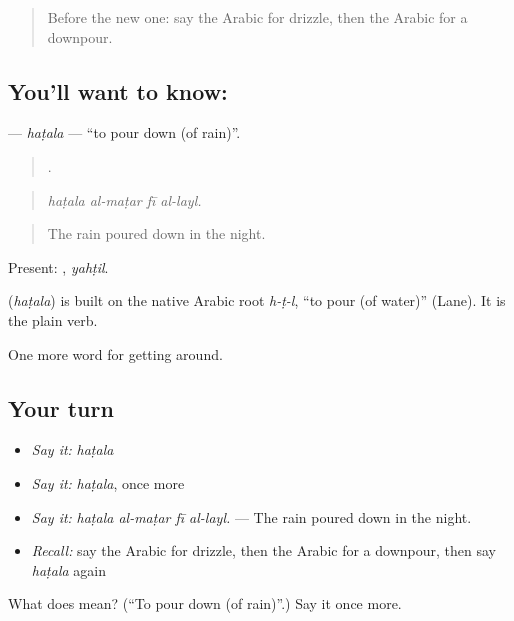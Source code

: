 \begin{quote}
Before the new one: say the Arabic for drizzle, then the Arabic for a downpour.
\end{quote}

\subsection*{You'll want to know: }
\textbf{} — \emph{haṭala} — \textquotedblleft{}to pour down (of rain)\textquotedblright{}.

\begin{quote}
   .
\end{quote}

\begin{quote}
\emph{haṭala al-maṭar fī al-layl.}
\end{quote}

\begin{quote}
The rain poured down in the night.
\end{quote}

Present: , \emph{yahṭil}.

\begin{cousinweb}
\textbf{} (\emph{haṭala}) is built on the native Arabic root \emph{h-ṭ-l}, \textquotedblleft{}to pour (of water)\textquotedblright{} (Lane). It is the plain verb.
\end{cousinweb}

\begin{grammarlens}[title={What you've built}]
One more word for getting around.
\end{grammarlens}

\subsection*{Your turn}
\begin{itemize}
\raggedright
  \item \emph{Say it:} \emph{haṭala}
  \item \emph{Say it:} \emph{haṭala}, once more
  \item \emph{Say it:} \emph{haṭala al-maṭar fī al-layl.} — The rain poured down in the night.
  \item \emph{Recall:} say the Arabic for drizzle, then the Arabic for a downpour, then say \emph{haṭala} again
\end{itemize}

\begin{tcolorbox}[breakable,colback=teal!4,colframe=teal!35!black,title={Before you move on}]
What does  mean? (\textquotedblleft{}To pour down (of rain)\textquotedblright{}.) Say it once more.
\end{tcolorbox}
